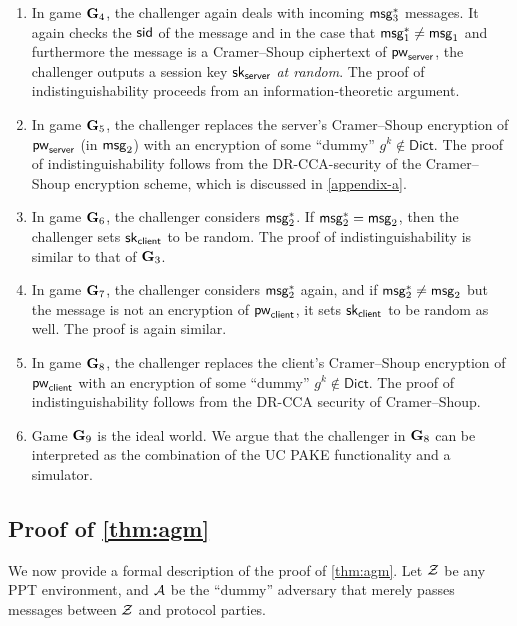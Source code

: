 \begin{enumerate}
	\item In game $\mathbf{G}_4$, the challenger again deals with incoming $\mathsf{msg}_{3}^{*}$ messages. It again checks the $\mathsf{sid}$ of the message and in the case that $\mathsf{msg}_{1}^{*}\neq\mathsf{msg}_{1}$ and furthermore the message is a Cramer--Shoup ciphertext of $\mathsf{pw}_{\mathsf{server}}$, the challenger outputs a session key $\mathsf{sk}_{\mathsf{server}}$ \textit{at random}. The proof of indistinguishability proceeds from an information-theoretic argument.
	
	\item In game $\mathbf{G}_5$, the challenger replaces the server's Cramer--Shoup encryption of $\mathsf{pw}_{\mathsf{server}}$ (in $\mathsf{msg}_{2}$) with an encryption of some ``dummy'' $g^k\notin\mathsf{Dict}$. The proof of indistinguishability follows from the DR-CCA-security of the Cramer--Shoup encryption scheme, which is discussed in \cref{appendix-a}.
	
	\item In game $\mathbf{G}_6$, the challenger considers $\mathsf{msg}_{2}^{*}$. If $\mathsf{msg}_{2}^{*}=\mathsf{msg}_{2}$, then the challenger sets $\mathsf{sk}_{\mathsf{client}}$ to be random. The proof of indistinguishability is similar to that of $\mathbf{G}_3$.
	
	\item In game $\mathbf{G}_7$, the challenger considers $\mathsf{msg}_{2}^{*}$ again, and if $\mathsf{msg}_{2}^{*}\neq\mathsf{msg}_{2}$ but the message is not an encryption of $\mathsf{pw}_{\mathsf{client}}$, it sets $\mathsf{sk}_{\mathsf{client}}$ to be random as well. The proof is again similar.
	
	\item In game $\mathbf{G}_8$, the challenger replaces the client's Cramer--Shoup encryption of $\mathsf{pw}_{\mathsf{client}}$ with an encryption of some ``dummy'' $g^k\notin\mathsf{Dict}$. The proof of indistinguishability follows from the DR-CCA security of Cramer--Shoup.
	
	\item Game $\mathbf{G}_9$ is the ideal world. We argue that the challenger in $\mathbf{G}_8$ can be interpreted as the combination of the UC PAKE functionality and a simulator.
\end{enumerate} 


\subsection{Proof of \cref{thm:agm}}

We now provide a formal description of the proof of \cref{thm:agm}. Let $\mathcal{Z}$ be any PPT environment, and $\mathcal{A}$ be the ``dummy'' adversary that merely passes messages between $\mathcal{Z}$ and protocol parties.

